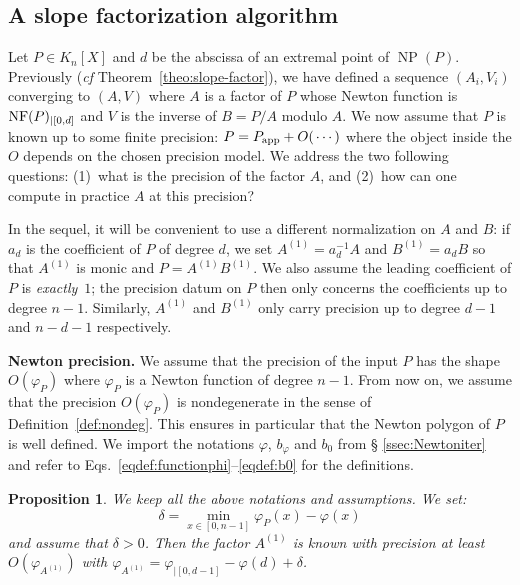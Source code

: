 \documentclass{sig-alternate-05-2015}
\DeclareMathOperator{\NP}{NP}
\newcommand{\NF}{\text{\rm NF}}
\newcommand{\app}{\textrm{app}}
\newtheorem{prop}[theo]{Proposition}
\theoremstyle{definition}
\begin{document}
\subsection{A slope factorization algorithm}

Let $P \in K_n[X]$ and $d$ be the abscissa of an extremal point of 
$\NP(P)$. Previously (\emph{cf} Theorem~\ref{theo:slope-factor}), we 
have defined a sequence $(A_i, V_i)$ converging to $(A,V)$ where $A$ is 
a factor of $P$ whose Newton function is $\NF(P)_{|[0,d]}$ and $V$ is the inverse of $B = P/A$ modulo $A$.
We now assume that $P$ is known up to some finite precision: $P = P_\app + 
O(\hspace{0.5mm}\cdots)$ where the object inside the $O$ depends on the 
chosen precision model. We address the two following questions:
(1)~what is the precision of the factor $A$, and
(2)~how can one compute in practice $A$ at this precision?

In the sequel, it will be convenient to use a different normalization on 
$A$ and $B$: if $a_d$ is the coefficient of $P$ of degree $d$, we set
$A^{(1)} = a_d^{-1} A$ and $B^{(1)} = a_d B$
so that $A^{(1)}$ is monic and $P = A^{(1)} B^{(1)}$. We also assume
the leading coefficient of $P$ is \emph{exactly}~$1$; the precision datum on $P$ then 
only concerns the coefficients up to degree $n{-}1$. Similarly,
$A^{(1)}$ and $B^{(1)}$ only carry
precision up to degree $d{-}1$ and $n{-}d{-}1$ respectively.

\medskip

\noindent
{\bf Newton precision.}
We assume that the precision of the input $P$ has the shape 
$O(\varphi_P)$ where $\varphi_P$ is a Newton function of degree 
$n{-}1$. From now on, we assume that the precision $O(\varphi_P)$ 
is nondegenerate in the sense of Definition~\ref{def:nondeg}. This
ensures in particular that the Newton polygon of $P$ is well defined. 
We import the notations $\varphi$, $b_\varphi$ and $b_0$ from \S 
\ref{ssec:Newtoniter} and refer to 
Eqs.~\eqref{eqdef:functionphi}--\eqref{eqdef:b0} for the definitions.

\begin{prop}
\label{prop:Newtonprecslope}
We keep all the above notations and assumptions. We set:
$$\delta = \min_{x \in [0,n{-}1]} \varphi_P(x) - \varphi(x)$$
and assume that $\delta > 0$. 
Then the factor $A^{(1)}$ is known with precision at least 
$O(\varphi_{A^{(1)}})$ with
$\varphi_{A^{(1)}} = \varphi_{|[0,d{-}1]} - \varphi(d) + \delta$.
\end{prop}
\end{document}
